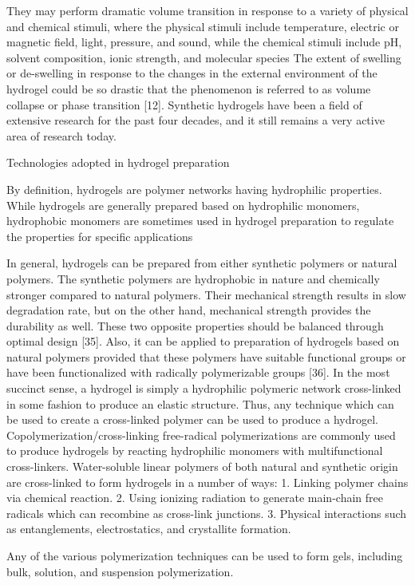 \documentclass[../../main-notes.tex]{subfiles}
\begin{document}
They may perform dramatic volume transition in response to a variety of physical and chemical stimuli, where the physical stimuli include temperature, electric or magnetic field, light, pressure, and sound, while the chemical stimuli include pH, solvent composition, ionic strength, and molecular species
The extent of swelling or de-swelling in response to the changes in the external environment of the hydrogel could be so drastic that the phenomenon is referred to as volume collapse or phase transition [12]. Synthetic hydrogels have been a field of extensive research for the past four decades, and it still remains a very active area of research today.


Technologies adopted in hydrogel preparation

By definition, hydrogels are polymer networks having hydrophilic properties. 
While hydrogels are generally prepared based on hydrophilic monomers, hydrophobic monomers are sometimes used in hydrogel preparation to regulate the properties for specific applications

In general, hydrogels can be prepared from either synthetic polymers or natural polymers. 
The synthetic polymers are hydrophobic in nature and chemically stronger compared to natural polymers. 
Their mechanical strength results in slow degradation rate, but on the other hand, mechanical strength provides the durability as well. 
These two opposite properties should be balanced through optimal design [35]. 
Also, it can be applied to preparation of hydrogels based on natural polymers provided that these polymers have suitable functional groups or have been functionalized with radically polymerizable groups [36]. 
In the most succinct sense, a hydrogel is simply a hydrophilic polymeric network cross-linked in some fashion to produce an elastic structure. 
Thus, any technique which can be used to create a cross-linked polymer can be used to produce a hydrogel. 
Copolymerization/cross-linking free-radical polymerizations are commonly used to produce hydrogels by reacting hydrophilic monomers with multifunctional cross-linkers. 
Water-soluble linear polymers of both natural and synthetic origin are cross-linked to form hydrogels in a number of ways:
1. Linking polymer chains via chemical reaction. 
2. Using ionizing radiation to generate main-chain free radicals which can recombine as cross-link junctions. 
3. Physical interactions such as entanglements, electrostatics, and crystallite formation.

Any of the various polymerization techniques can be used to form gels, including bulk, solution, and suspension polymerization.
\end{document}
